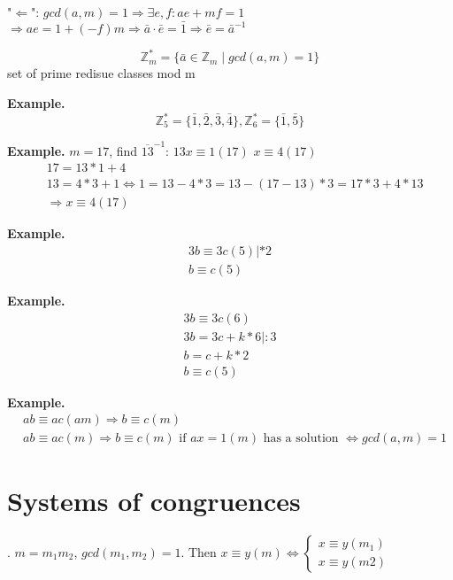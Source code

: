 "$\Leftarrow$":
  $gcd(a,m) = 1 \Rightarrow \exists e,f : ae + mf = 1$ \\
  $\Rightarrow ae = 1 + (-f)m \Rightarrow \bar{a} \cdot \bar{e} = \bar{1} \Rightarrow \bar{e} = \bar{a}^{-1}$

\begin{definition}
\[
  \mathbb{Z}_m^{*} = \{ \bar{a} \in \mathbb{Z}_m \mid gcd(a,m) = 1 \}
\]
set of prime redisue classes mod m
\end{definition}

\textbf{Example.}
\[
  \mathbb{Z}_5^{*} = \{ \bar{1}, \bar{2}, \bar{3}, \bar{4} \}, \mathbb{Z}_6^{*} = \{ \bar{1}, \bar{5} \}
\]

\textbf{Example.}
$ m = 17$, find $\overline{13}^{-1}$: $ 13 x \equiv 1 (17)$ $x \equiv 4 (17)$
\begin{align*}
  &17 = 13 * 1 +4\\
   &13 = 4*3 +1 \iff 1 = 13-4*3 = 13-(17-13)*3 = 17*3+4*13 \\
   & \Rightarrow x \equiv 4 (17)
\end{align*}

\textbf{Example.}
\begin{align*}
  3b \equiv 3c (5) | *2 \\
  b \equiv c(5)
\end{align*}

\textbf{Example.}
\begin{align*}
  3b \equiv 3c (6) \\
  3b = 3c + k*6 | :3 \\
  b = c + k*2 \\
  b \equiv c(5)
\end{align*}

\textbf{Example.}
\begin{align*}
  &ab \equiv ac (am) \Rightarrow b \equiv  c (m) \\
  &ab \equiv ac (m) \Rightarrow b \equiv c (m)
    \text{ if } ax = 1 (m) \text{ has a solution } \iff gcd(a,m) = 1
\end{align*}

\section{Systems of congruences}

\Theorem.
$m = m_1 m_2$, $gcd(m_1, m_2) = 1$. Then $x \equiv y (m) \iff \begin{cases} x \equiv y (m_1) \\ x \equiv y (m2) \end{cases}$

